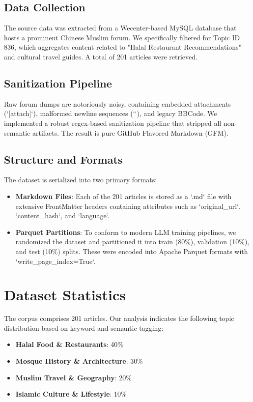 \documentclass[11pt,a4paper]{article}
\begin{document}
\subsection{Data Collection}
The source data was extracted from a Wecenter-based MySQL database that hosts a prominent Chinese Muslim forum. We specifically filtered for Topic ID 836, which aggregates content related to "Halal Restaurant Recommendations" and cultural travel guides. A total of 201 articles were retrieved.

\subsection{Sanitization Pipeline}
Raw forum dumps are notoriously noisy, containing embedded attachments (`[attach]`), malformed newline sequences (`\n\n`), and legacy BBCode. We implemented a robust regex-based sanitization pipeline that stripped all non-semantic artifacts. The result is pure GitHub Flavored Markdown (GFM).

\subsection{Structure and Formats}
The dataset is serialized into two primary formats:
\begin{itemize}
    \item \textbf{Markdown Files}: Each of the 201 articles is stored as a `.md` file with extensive FrontMatter headers containing attributes such as `original_url`, `content_hash`, and `language`.
    \item \textbf{Parquet Partitions}: To conform to modern LLM training pipelines, we randomized the dataset and partitioned it into train (80\%), validation (10\%), and test (10\%) splits. These were encoded into Apache Parquet formats with `write_page_index=True`.
\end{itemize}

\section{Dataset Statistics}
The corpus comprises 201 articles. Our analysis indicates the following topic distribution based on keyword and semantic tagging:
\begin{itemize}
    \item \textbf{Halal Food \& Restaurants}: 40\%
    \item \textbf{Mosque History \& Architecture}: 30\%
    \item \textbf{Muslim Travel \& Geography}: 20\%
    \item \textbf{Islamic Culture \& Lifestyle}: 10\%
\end{itemize}
\end{document}
